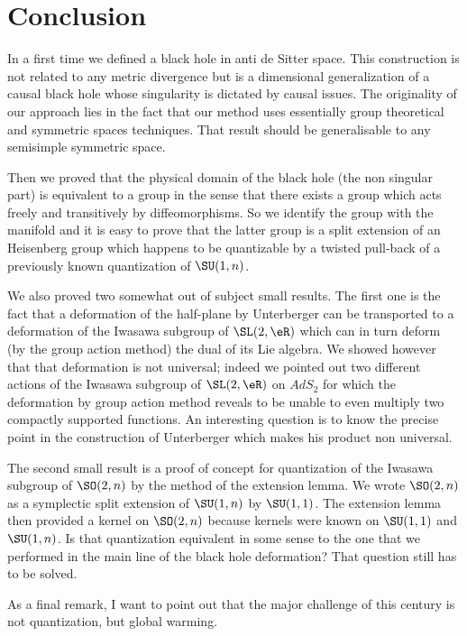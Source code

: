 
\section{Conclusion}

In a first time we defined a black hole in anti de Sitter space. This construction is not related to any metric divergence but is a dimensional generalization of a causal black hole whose singularity is dictated by causal issues. The originality of our approach lies in the fact that our method uses essentially group theoretical and symmetric spaces techniques. That result should be generalisable to any semisimple symmetric space.

Then we proved that the physical domain of the black hole (the non singular part) is equivalent to a group in the sense that there exists a group which acts freely and transitively by diffeomorphisms. So we identify the group with the manifold and it is easy to prove that the latter group is a split extension of an Heisenberg group which happens to be quantizable by a twisted pull-back of a previously known quantization of $\SU(1,n)$. 

We also proved two somewhat out of subject small results. The first one is the fact that a deformation of the half-plane by Unterberger can be transported to a deformation of the Iwasawa subgroup of $\SL(2,\eR)$ which can in turn deform (by the group action method) the dual of its Lie algebra. We  showed however that that deformation is not universal; indeed we pointed out two different actions of the Iwasawa subgroup of $\SL(2,\eR)$ on $AdS_2$ for which the deformation by group action method reveals to be unable to even multiply two compactly supported functions. An interesting question is to know the precise point in the construction of Unterberger which makes his product non universal.

The second small result is a proof of concept for quantization of the Iwasawa subgroup of $\SO(2,n)$ by the method of the extension lemma. We wrote $\SO(2,n)$ as a symplectic split extension of $\SU(1,n)$ by $\SU(1,1)$. The extension lemma then provided a kernel on $\SO(2,n)$ because kernels were known on $\SU(1,1)$ and $\SU(1,n)$. Is that quantization equivalent in some sense to the one that we performed in the main line of the black hole deformation? That question still has to be solved.

As a final remark, I want to point out that the major challenge of this century is not quantization, but global warming.
